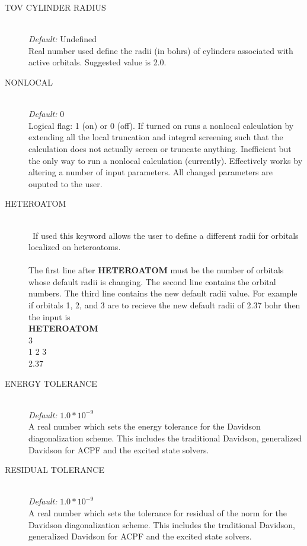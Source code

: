 \documentclass{article}
\begin{document}
\begin{description}
        \item[TOV CYLINDER RADIUS ] \hfill \\
        \emph{Default:} Undefined \hfill \\
        Real number used define the radii (in bohrs) of cylinders associated with active orbitals. Suggested value is 2.0.
        
        
       	\item[NONLOCAL] \hfill \\
       	\emph{Default:} 0 \hfill \\
       	Logical flag: 1 (on) or 0 (off). If turned on runs a nonlocal calculation by extending all the local truncation and integral screening such that the calculation does not actually screen or truncate anything. Inefficient but the only way to run a nonlocal calculation (currently). Effectively works by altering a number of input parameters. All changed parameters are ouputed to the user.
        
        \item[HETEROATOM ] \hfill \\\
        If used this keyword allows the user to  define a different radii for orbitals localized on heteroatoms.  
        \hfill \\
        \hfill \\
        The first line after \textbf{HETEROATOM} must be the number of orbitals whose default radii is changing. The second line contains the orbital numbers. The third line contains the new default radii value. For example if orbitals 1, 2, and 3 are to recieve the new default radii of 2.37 bohr then the input is 
        \hfill \\
        \textbf{HETEROATOM} \hfill \\
        3 \hfill \\
        1 2 3 \hfill \\
        2.37 \hfill \\
        
        
        \item[ENERGY TOLERANCE] \hfill \\
        \emph{Default:} $1.0*10^{-9}$ \hfill \\
        A real number which sets the energy tolerance for the Davidson diagonalization scheme. This includes the traditional Davidson, generalized Davidson for ACPF and the excited state solvers. 
        
        \item[RESIDUAL TOLERANCE] \hfill \\
        \emph{Default:} $1.0*10^{-9}$ \hfill \\
        A real number which sets the tolerance for residual of the norm for the Davidson diagonalization scheme. This includes the traditional Davidson, generalized Davidson for ACPF and the excited state solvers. 
        

\end{description}
\end{document}
